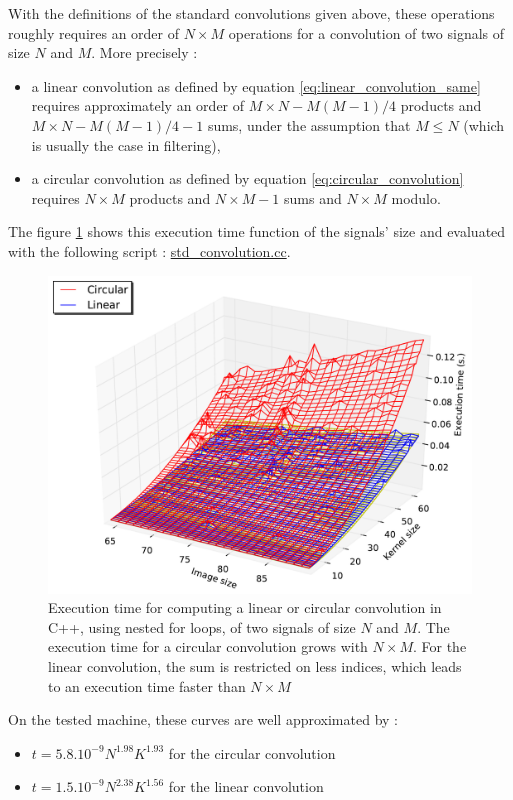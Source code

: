 \documentclass[a4paper,10pt,twoside]{article}
\begin{document}
With the definitions of the standard convolutions given above, these operations roughly requires an order of $N\times M$ operations for a convolution of two signals of size $N$ and $M$. More precisely :
\begin{itemize}
\item a linear convolution as defined by equation \ref{eq:linear_convolution_same} requires approximately an order of $M\times N - M(M-1)/4$ products and $M\times N - M(M-1)/4 -1$ sums, under the assumption that $M \leq N$ (which is usually the case in filtering),
\item a circular convolution as defined by equation \ref{eq:circular_convolution} requires $N\times M$ products and $N\times M-1$ sums and $N\times M$ modulo.
\end{itemize}
The figure \ref{fig:benchmark_std_convolution.pdf} shows this execution time function of the signals' size and evaluated with the following script : \href{http://jeremy.fix.free.fr/Software/Convolution/std_convolution.cc}{std\_convolution.cc}.
\begin{figure}[htbp]
\center \includegraphics[width=0.5\linewidth]{Images/benchmark_std_convolution.pdf}
\caption{\label{fig:benchmark_std_convolution.pdf} Execution time for computing a linear or circular convolution in C++, using nested for loops, of two signals of size $N$ and $M$. The execution time for a circular convolution grows with $N \times M$. For the linear convolution, the sum is restricted on less indices, which leads to an execution time faster than $N \times M$}
\end{figure}

On the tested machine, these curves are well approximated by :
\begin{itemize}
\item $t = 5.8.10^{-9} N^{1.98} K^{1.93}$ for the circular convolution
\item $t = 1.5.10^{-9} N^{2.38} K^{1.56}$ for the linear convolution
\end{itemize}
\end{document}
